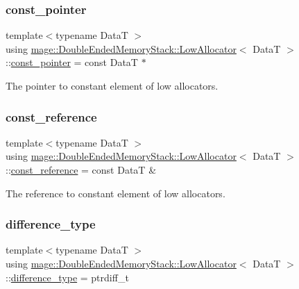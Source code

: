 \subsubsection{\texorpdfstring{const\+\_\+pointer}{const\_pointer}}
{\footnotesize\ttfamily template$<$typename DataT $>$ \\
using \hyperlink{structmage_1_1_double_ended_memory_stack_1_1_low_allocator}{mage\+::\+Double\+Ended\+Memory\+Stack\+::\+Low\+Allocator}$<$ DataT $>$\+::\hyperlink{structmage_1_1_double_ended_memory_stack_1_1_low_allocator_a5c3c7e9fde98e421a2f22d6b7cfbc83e}{const\+\_\+pointer} =  const DataT $\ast$}

The pointer to constant element of low allocators. \hypertarget{structmage_1_1_double_ended_memory_stack_1_1_low_allocator_a08f0e62b93ff0007afdf1ee565fcd490}{}\label{structmage_1_1_double_ended_memory_stack_1_1_low_allocator_a08f0e62b93ff0007afdf1ee565fcd490} 
\subsubsection{\texorpdfstring{const\+\_\+reference}{const\_reference}}
{\footnotesize\ttfamily template$<$typename DataT $>$ \\
using \hyperlink{structmage_1_1_double_ended_memory_stack_1_1_low_allocator}{mage\+::\+Double\+Ended\+Memory\+Stack\+::\+Low\+Allocator}$<$ DataT $>$\+::\hyperlink{structmage_1_1_double_ended_memory_stack_1_1_low_allocator_a08f0e62b93ff0007afdf1ee565fcd490}{const\+\_\+reference} =  const DataT \&}

The reference to constant element of low allocators. \hypertarget{structmage_1_1_double_ended_memory_stack_1_1_low_allocator_a146f18c8e4654d7c3462c49aa87b509a}{}\label{structmage_1_1_double_ended_memory_stack_1_1_low_allocator_a146f18c8e4654d7c3462c49aa87b509a} 
\subsubsection{\texorpdfstring{difference\+\_\+type}{difference\_type}}
{\footnotesize\ttfamily template$<$typename DataT $>$ \\
using \hyperlink{structmage_1_1_double_ended_memory_stack_1_1_low_allocator}{mage\+::\+Double\+Ended\+Memory\+Stack\+::\+Low\+Allocator}$<$ DataT $>$\+::\hyperlink{structmage_1_1_double_ended_memory_stack_1_1_low_allocator_a146f18c8e4654d7c3462c49aa87b509a}{difference\+\_\+type} =  ptrdiff\+\_\+t}

